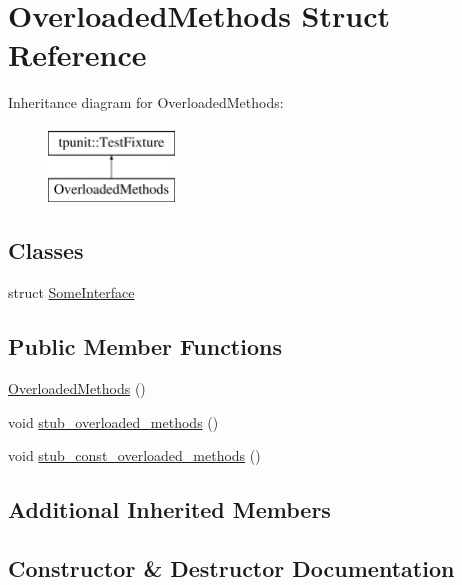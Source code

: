 \hypertarget{structOverloadedMethods}{}\section{Overloaded\+Methods Struct Reference}
\label{structOverloadedMethods}
Inheritance diagram for Overloaded\+Methods\+:\begin{figure}[H]
\begin{center}
\leavevmode
\includegraphics[height=2.000000cm]{structOverloadedMethods}
\end{center}
\end{figure}
\subsection*{Classes}
\begin{DoxyCompactItemize}
\item 
struct \mbox{\hyperlink{structOverloadedMethods_1_1SomeInterface}{Some\+Interface}}
\end{DoxyCompactItemize}
\subsection*{Public Member Functions}
\begin{DoxyCompactItemize}
\item 
\mbox{\hyperlink{structOverloadedMethods_a6c033d5a53a014e74e5a33d9c82714b9}{Overloaded\+Methods}} ()
\item 
void \mbox{\hyperlink{structOverloadedMethods_aee971c77d0fc0a18fc78e2881c2c6445}{stub\+\_\+overloaded\+\_\+methods}} ()
\item 
void \mbox{\hyperlink{structOverloadedMethods_af6ed7219a721f9e07a5eef39f921e617}{stub\+\_\+const\+\_\+overloaded\+\_\+methods}} ()
\end{DoxyCompactItemize}
\subsection*{Additional Inherited Members}


\subsection{Constructor \& Destructor Documentation}
\mbox{\label{structOverloadedMethods_a6c033d5a53a014e74e5a33d9c82714b9}} 
